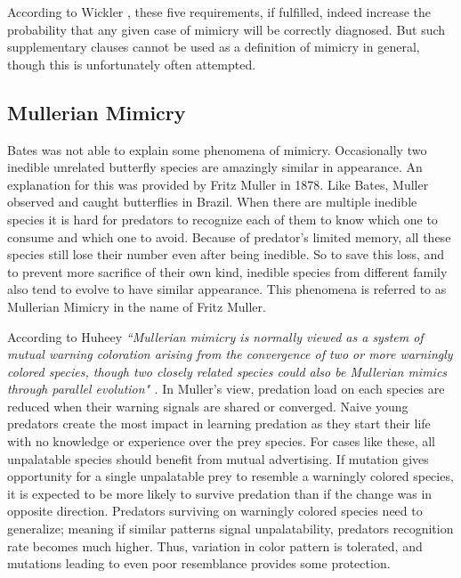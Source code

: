 \documentclass[letterpaper]{article}
\numberwithin{equation}{section}
\begin{document}
According to Wickler \cite{wickler1986}, these five requirements, if fulfilled, indeed increase the probability that any given case of mimicry will be correctly diagnosed. But such supplementary clauses cannot be used as a definition of mimicry in general, though this is unfortunately often attempted. 

\subsection{Mullerian Mimicry}
\label{subsec:mullerian-mimicry}
Bates was not able to explain some phenomena of mimicry. Occasionally two inedible unrelated butterfly species are amazingly similar in appearance. An explanation for this was provided by Fritz Muller in 1878. Like Bates, Muller observed and caught butterflies in Brazil. When there are multiple inedible species it is hard for predators to recognize each of them to know which one to consume and which one to avoid. Because of predator's limited memory, all these species still lose their number even after being inedible. So to save this loss, and to prevent more sacrifice of their own kind, inedible species from different family also tend to evolve to have similar appearance. This phenomena is referred to as Mullerian Mimicry in the name of Fritz Muller.

According to Huheey \cite{huheey1988} \textsl{``Mullerian mimicry is normally viewed as a system of mutual warning coloration arising from the convergence of two or more warningly colored species, though two closely related species could also be Mullerian mimics through parallel evolution" \cite{muller1879}.} In Muller's view, predation load on each species are reduced when their warning signals are shared or converged. Naive young predators create the most impact in learning predation as they start their life with no knowledge or experience over the prey species. For cases like these, all unpalatable species should benefit from mutual advertising. If mutation gives opportunity for a single unpalatable prey to resemble a warningly colored species, it is expected to be more likely to survive predation than if the change was in opposite direction. Predators surviving on warningly colored species need to generalize; meaning if similar patterns signal unpalatability, predators recognition rate becomes much higher. Thus, variation in color pattern is tolerated, and mutations leading to even poor resemblance provides some protection. 
\end{document}
